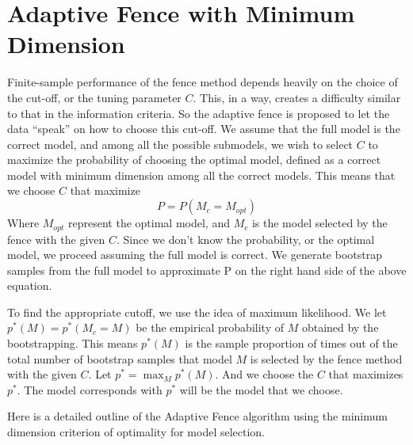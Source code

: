\documentclass[11pt,letter]{article}
\begin{document}
\section{Adaptive Fence with Minimum Dimension}

Finite-sample performance of the fence method depends heavily on the choice of the cut-off, or the tuning parameter $C$. This, in a way, creates a difficulty similar to that in the information criteria. So the adaptive fence is proposed to let the data “speak” on how to choose this cut-off. We assume that the full model is the correct model, and among all the possible submodels, we wish to select $C$ to maximize the probability of choosing the optimal model, defined as a correct model with minimum dimension among all the correct models. This means that we choose $C$ that maximize 
$$ P = P(M_c = M_{opt} ) $$
Where $M_{opt}$ represent the optimal model, and $M_c$ is the model selected by the fence with the given $C$.  Since we don’t know the probability, or the optimal model, we proceed assuming the full model is correct.  We generate bootstrap samples from the full model to approximate P on the right hand side of the above equation.

To find the appropriate cutoff, we use the idea of maximum likelihood.  We let $p^*(M) = p^*(M_c = M)$ be the empirical probability of $M$ obtained by the bootstrapping. This means $p^*(M)$ is the sample proportion of times out of the total number of bootstrap samples that model $M$ is selected by the fence method with the given $C$.  Let $p^* = \max_M p^*(M)$.  And we choose the $C$ that maximizes $p^*$.  The model corresponds with $p^*$ will be the model that we choose.  

Here is a detailed outline of the Adaptive Fence algorithm using the minimum dimension criterion of optimality for model selection. 
\end{document}
